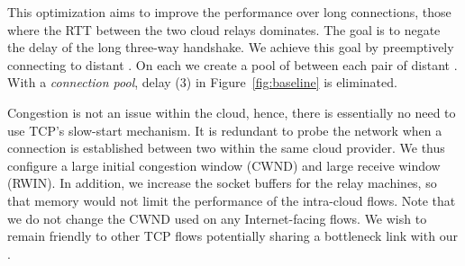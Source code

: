   This optimization aims to improve the performance over long connections, \ie those where the RTT between the two cloud relays dominates. The goal is to negate the delay of the long three-way handshake. We achieve this goal by preemptively connecting to distant \relays. On each \relay we create a pool of \reconn between each pair of distant \relays.
With a \textit{connection pool}, delay (3) in Figure~\ref{fig:baseline} is eliminated.

Congestion is not an issue within the cloud, hence, there is essentially no need to use TCP's slow-start mechanism. It is redundant to probe the network when a connection is established between two \relays within the same cloud provider. We thus configure a large initial congestion window (CWND) and large receive window (RWIN). In addition, we increase the socket buffers for the relay machines, so that memory would not limit the performance of the intra-cloud flows.
Note that we do not change the CWND used on any Internet-facing flows. We wish to remain friendly to other TCP flows potentially sharing a bottleneck link with our \relays.







